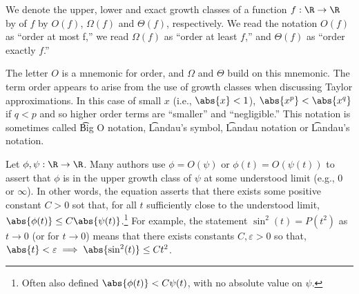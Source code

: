 We denote the upper, lower and exact growth classes of a function $f: \R  \to \R $ by of $f$ by $O(f)$, $\Omega (f)$ and $\Theta (f)$, respectively.
We read the notation $O(f)$ as ``order at most f,'' we read $\Omega (f)$ as ``order at least $f$,'' and $\Theta (f)$ as ``order exactly $f$.''

The letter $O$ is a mnemonic for order, and $\Omega $ and $\Theta $ build on this mnemonic.
The term order appears to arise from the use of growth classes when discussing Taylor approximations.
In this case of small $x$ (i.e., $\abs{x} < 1$), $\abs{x^p} < \abs{x^q}$ if $q < p$ and so higher order terms are ``smaller'' and ``negligible.''
This notation is sometimes called \t{Big O notation}, \t{Landau's symbol}, \t{Landau notation} or \t{Landau's notation}.

Let $\phi , \psi : \R  \to \R $.
Many authors use $\phi  = O(\psi )$ or $\phi (t) = O(\psi (t))$ to assert that $\phi $ is in the upper growth class of $\psi $ at some understood limit (e.g., $0$ or $\infty$).
In other words, the equation asserts that there exists some positive constant $C > 0$ sot that, for all $t$ sufficiently close to the understood limit, $\abs{\phi (t)} \leq C \abs{\psi (t)}$.\footnote{Often also defined $\abs{\phi (t)} < C\psi (t)$, with no absolute value on $\psi $.}
For example, the statement $\sin^2(t) = P(t^2)$ as $t \to 0$ (or for $t \to 0$) means that there exists constants $C, \varepsilon  > 0$ so that, $\abs{t} < \varepsilon  \implies \abs{\sin^2(t)} \leq Ct^2$.
